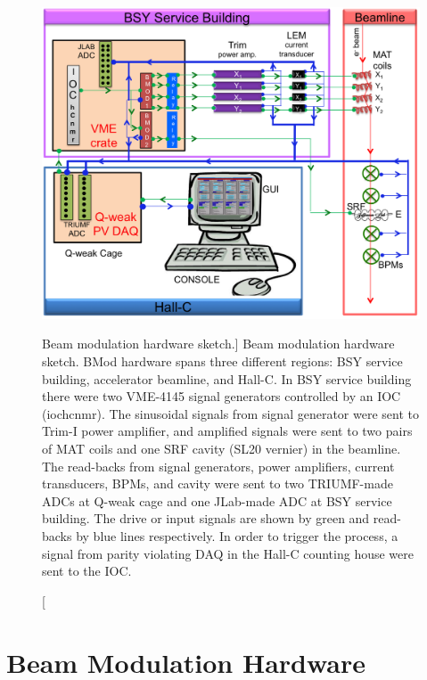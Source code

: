 \begin{singlespace}
\begin{figure}[!h]
	\begin{center}
	\includegraphics[width=15.0cm]{figures/BModHardwareSketch}
	\end{center}
	\caption
	[Beam modulation hardware sketch.]
	{Beam modulation hardware sketch. BMod hardware spans three different regions: BSY service building, accelerator beamline, and Hall-C. In BSY service building there were two VME-4145 signal generators controlled by an IOC (iochcnmr). The sinusoidal signals from signal generator were sent to Trim-I power amplifier, and amplified signals were sent to two pairs of MAT coils and one SRF cavity (SL20 vernier) in the beamline. The read-backs from signal generators, power amplifiers, current transducers, BPMs, and cavity were sent to two TRIUMF-made ADCs at Q-weak cage and one JLab-made ADC at BSY service building. The drive or input signals are shown by green and read-backs by blue lines respectively. In order to trigger the process, a signal from parity violating DAQ in the Hall-C counting house were sent to the IOC.}
	\label{fig:BModHardwareSketch}
\end{figure}
\end{singlespace}

\section{Beam Modulation Hardware}
\label{Beam Modulation Hardware}

